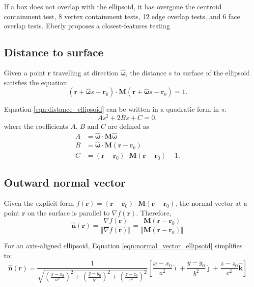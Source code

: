 If a box does not overlap with the ellipsoid, it has overgone the centroid containment test, 8 vertex containment tests, 12 edge overlap tests, and 6 face overlap tests. Eberly proposes a closest-features testing


\subsection{Distance to surface}
Given a point $\bm{r}$ travelling at direction $\bm{\hat{\omega}}$, the distance $s$ to surface of the ellipsoid satisfies the equation
\begin{equation}
    \left( \bm{r} + \bm{\hat{\omega}}s - \bm{r}_0 \right) \cdot \bm{M} \left(\bm{r} + \bm{\hat{\omega}}s - \bm{r}_0 \right) = 1.
    \label{eqn:distance_ellipsoid}
\end{equation}

Equation \ref{eqn:distance_ellipsoid} can be written in a quadratic form in $s$:
\begin{equation}
    As^2 + 2Bs + C = 0,
\end{equation}
where the coefficients $A$, $B$ and $C$ are defined as
\begin{align}
    A &= \bm{\hat{\omega}} \cdot \bm{M}\bm{\hat{\omega}} \\
    B &= \bm{\hat{\omega}} \cdot \bm{M}(\bm{r}-\bm{r}_0) \\
    C &= (\bm{r}-\bm{r}_0) \cdot \bm{M}(\bm{r}-\bm{r}_0) - 1.
\end{align}

\subsection{Outward normal vector}
Given the explicit form $f(\bm{r}) = (\bm{r} - \bm{r}_0) \cdot \bm{M}(\bm{r} - \bm{r}_0)$, the normal vector at a point $\bm{r}$ on the surface is parallel to $\nabla f(\bm{r})$. Therefore,
\begin{equation}
    \bm{\hat{n}} (\bm{r}) = \frac{\nabla f(\bm{r})}{\Vert \nabla f(\bm{r}) \Vert} = \frac{\bm{M}(\bm{r} - \bm{r}_0)}{\Vert \bm{M}(\bm{r} - \bm{r}_0) \Vert}
    \label{eqn:normal_vector_ellipsoid}
\end{equation}

For an axis-aligned ellipsoid, Equation \ref{eqn:normal_vector_ellipsoid} simplifies to:
\begin{equation}
    \bm{\hat{n}} (\bm{r}) = \frac{1}{\sqrt{\left(\frac{x-x_0}{a^2}\right)^2 + \left(\frac{y-y_0}{b^2}\right)^2 + \left(\frac{z-z_0}{c^2}\right)^2}} \left[\frac{x-x_0}{a^2} \bm{\hat{\imath}} + \frac{y-y_0}{b^2} \bm{\hat{\jmath}} + \frac{z-z_0}{c^2} \bm{\hat{k}} \right]
\end{equation}